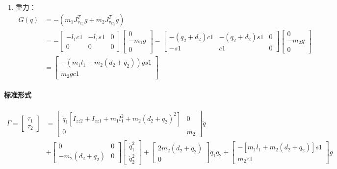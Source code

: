 \documentclass[
12pt, %
a4paper, 
oneside, %
headinclude,footinclude, %
]{scrartcl}
\begin{document}
{\begin{enumerate}
\begin{align*}
\end{align*}
\item 重力：
\begin{align*}
G(q) &= -(m_1 J_{v_{C_1}}^T g + m_2 J_{v_{C_2}}^T g) \\
&= -\begin{bmatrix} -l_1 c1 & -l_1 s1 & 0 \\ 0 & 0 & 0 \end{bmatrix} \begin{bmatrix} 0 \\ -m_1 g \\ 0 \end{bmatrix} - \begin{bmatrix} -(q_2 + d_2)c1 & -(q_2 + d_2)s1 & 0 \\ -s1 & c1 & 0 \end{bmatrix} \begin{bmatrix} 0 \\ -m_2 g \\ 0 \end{bmatrix} \\
&= \begin{bmatrix} -(m_1 l_1 + m_2(d_2 + q_2))gs1 \\ m_2 gc1 \end{bmatrix}
\end{align*}
\end{enumerate}
\paragraph{标准形式}
\begin{align*}
\Gamma = \begin{bmatrix} \tau_1 \\ \tau_2 \end{bmatrix} 
&= \begin{bmatrix} \ddot{q}_1[I_{zz2} + I_{zz1} + m_1 l_1^2 + m_2(d_2 + q_2)^2] & 0 \\ 0 & m_2 \end{bmatrix} \ddot{q} \\
&+ \begin{bmatrix} 0 & 0 \\ -m_2(d_2 + q_2) & 0 \end{bmatrix} \begin{bmatrix} \dot{q}_1^2\\ \dot{q}_2^2 \end{bmatrix} + \begin{bmatrix} 2m_2(d_2 + q_2) \\ 0 \end{bmatrix} \dot{q}_1 \dot{q}_2 + \begin{bmatrix} -[m_1 l_1 + m_2(d_2 + q_2)]s1 \\ m_2 c1 \end{bmatrix} g 
\end{align*}
}
\end{document}
